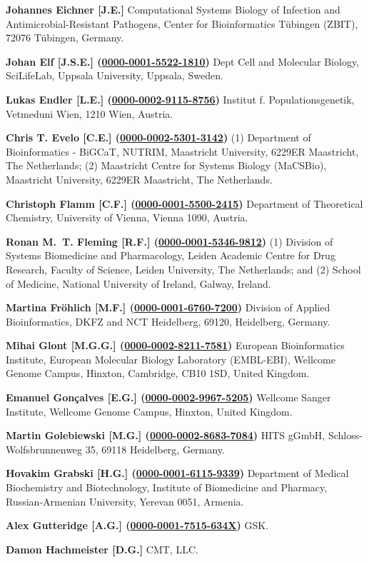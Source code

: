 \documentclass{sbml-paper}
\newcommand{\orcid}[1]{\href{https://orcid.org/#1}{#1}}
\begin{document}
\textbf{Johannes Eichner [J.E.]} Computational Systems Biology of Infection and Antimicrobial-Resistant Pathogens, Center for Bioinformatics Tübingen (ZBIT), 72076 Tübingen, Germany.

\textbf{Johan Elf [J.S.E.] (\orcid{0000-0001-5522-1810})} Dept Cell and Molecular Biology, SciLifeLab, Uppsala University, Uppsala, Sweden.

\textbf{Lukas Endler [L.E.] (\orcid{0000-0002-9115-8756})} Institut f. Populationsgenetik, Vetmeduni  Wien, 1210 Wien, Austria.

\textbf{Chris T. Evelo [C.E.] (\orcid{0000-0002-5301-3142})} (1) Department of Bioinformatics - BiGCaT, NUTRIM, Maastricht University, 6229ER Maastricht, The Netherlands; (2) Maastricht Centre for Systems Biology (MaCSBio), Maastricht University, 6229ER Maastricht, The Netherlands.

\textbf{Christoph Flamm [C.F.] (\orcid{0000-0001-5500-2415})} Department of Theoretical Chemistry, University of Vienna, Vienna 1090, Austria.

\textbf{Ronan M.~T. Fleming [R.F.] (\orcid{0000-0001-5346-9812})} (1) Division of Systems Biomedicine and Pharmacology, Leiden Academic Centre for Drug Research, Faculty of Science, Leiden University, The Netherlands; and (2) School of Medicine, National University of Ireland, Galway, Ireland.

\textbf{Martina Fröhlich [M.F.] (\orcid{0000-0001-6760-7200})} Division of Applied Bioinformatics, DKFZ and NCT Heidelberg, 69120, Heidelberg, Germany.

\textbf{Mihai Glont [M.G.G.] (\orcid{0000-0002-8211-7581})} European Bioinformatics Institute, European Molecular Biology Laboratory (EMBL-EBI), Wellcome Genome Campus, Hinxton, Cambridge, CB10 1SD, United Kingdom.

\textbf{Emanuel Gonçalves [E.G.] (\orcid{0000-0002-9967-5205})} Wellcome Sanger Institute, Wellcome Genome Campus, Hinxton, United Kingdom.

\textbf{Martin Golebiewski [M.G.] (\orcid{0000-0002-8683-7084})} HITS gGmbH, Schloss-Wolfsbrunnenweg 35, 69118 Heidelberg, Germany.

\textbf{Hovakim Grabski [H.G.] (\orcid{0000-0001-6115-9339})} Department of Medical Biochemistry and Biotechnology, Institute of Biomedicine and Pharmacy, Russian-Armenian University, Yerevan 0051, Armenia.

\textbf{Alex Gutteridge [A.G.] (\orcid{0000-0001-7515-634X})} GSK.

\textbf{Damon Hachmeister [D.G.]} CMT, LLC.
\end{document}
